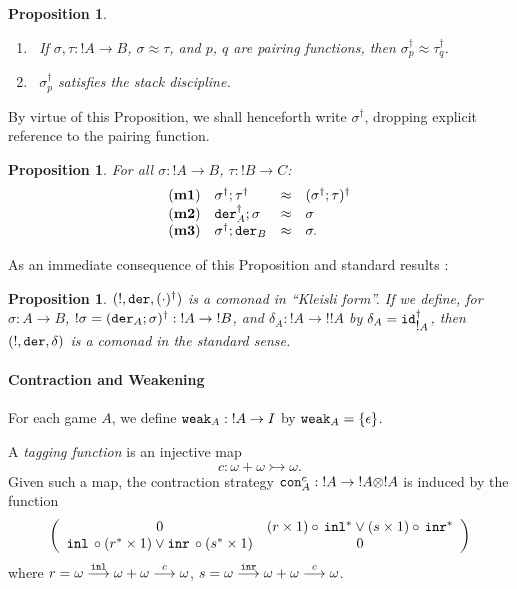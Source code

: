 \documentclass[11pt]{article}
\newtheorem{proposition}[theorem]{Proposition}
\newcommand{\Mat}[4]{\left( \begin{array}{cc}
#1 & #2 \\
#3 & #4
\end{array} \right)}
\newcommand{\Deq}{\approx}
\newcommand{\ofcourse}{\mbox{$!$}}
\newcommand{\tensor}{\mbox{$\otimes$}}
\begin{document}
\begin{proposition}
\begin{enumerate}
\item \, If $\sigma, \tau : \ofcourse A \rightarrow B$, $\sigma \Deq \tau$, and $p$, $q$
are pairing functions, then $\sigma^{\dagger}_{p} \Deq \tau^{\dagger}_{q}$.
\item \, $\sigma^{\dagger}_{p}$ satisfies the stack discipline.
\end{enumerate}
\end{proposition}
By virtue of this Proposition, we shall henceforth write $\sigma^{\dagger}$,
dropping explicit reference to the pairing function.

\begin{proposition}
For all $\sigma : \ofcourse A \rightarrow B$, $\tau : \ofcourse B \rightarrow C$:
\[ \begin{array}{clcl}
({\bf m1}) & \sigma^{\dagger} ; \tau^{\dagger} & \Deq & (\sigma^{\dagger} ;
\tau )^{\dagger} \\
({\bf m2}) & {\tt der}_{A}^{\dagger} ; \sigma & \Deq & \sigma \\
({\bf m3}) & \sigma^{\dagger} ; {\tt der}_{B} & \Deq & \sigma .
\end{array} \]
\end{proposition}
As an immediate consequence of this Proposition and standard results
\cite{ManesE:algt}:
\begin{proposition}
$(\ofcourse  , {\tt der}, ( \cdot )^{\dagger})$ is a comonad in ``Kleisli form''.
If we define, for $\sigma : A \rightarrow B$,
$\ofcourse  \sigma = ({\tt der}_{A} ; \sigma )^{\dagger} : \ofcourse A \rightarrow \ofcourse B$, and
$\delta_{A} : \ofcourse A \rightarrow \ofcourse \ofcourse A$ by $\delta_{A} = {\tt id}_{\ofcourse A}^{\dagger}$,
then $(\ofcourse  , {\tt der}, \delta )$ is a comonad in the standard sense.
\end{proposition}

\paragraph{Contraction and Weakening}
For each game $A$, we define ${\tt weak}_{A} : \ofcourse A \rightarrow I$ by
${\tt weak}_{A} = \{ \epsilon \}$.

A {\em tagging function} is an injective map
\[ c : \omega + \omega \rightarrowtail \omega . \]
Given such a map, the contraction strategy
${\tt con}_{A}^{c} : \ofcourse A \rightarrow \ofcourse A \tensor \ofcourse A$
is induced by the function
\[ \Mat{0}{(r \times 1) \circ \, {\tt inl}^{\ast} \vee (s \times 1)
\circ \, {\tt inr}^{\ast}}{{\tt inl} \, \circ (r^{\ast} \times 1)
\vee {\tt inr} \, \circ(s^{\ast} \times 1)} {0} \] where $r =
\omega \stackrel{\tt inl}{\longrightarrow} \omega + \omega
\stackrel{c}{\longrightarrow} \omega$, $s = \omega \stackrel{\tt
inr}{\longrightarrow} \omega + \omega
\stackrel{c}{\longrightarrow} \omega$.
\end{document}
